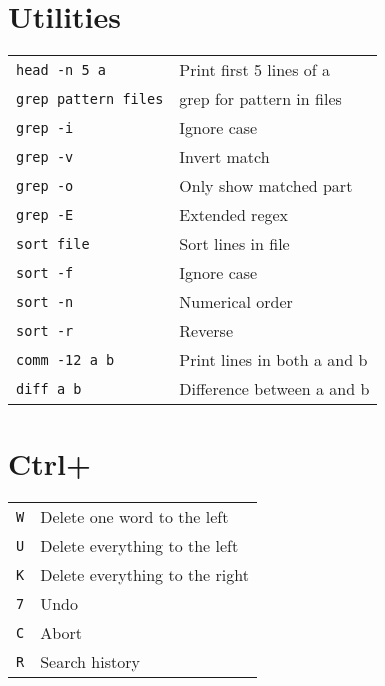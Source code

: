 \documentclass[a4paper, twocolumn]{article}
\renewcommand{\tt}{\texttt}
\begin{document}
\section{Utilities}
\begin{tabular}{ll}
    \tt{head -n 5 a}        & Print first 5 lines of a              \\
    \tt{grep pattern files} & grep for pattern in files             \\
    \tt{grep -i}            & Ignore case                           \\
    \tt{grep -v}            & Invert match                          \\
    \tt{grep -o}            & Only show matched part                \\
    \tt{grep -E}            & Extended regex                        \\
    \tt{sort file}          & Sort lines in file                    \\
    \tt{sort -f}            & Ignore case                           \\
    \tt{sort -n}            & Numerical order                       \\
    \tt{sort -r}            & Reverse                               \\
    \tt{comm -12 a b}       & Print lines in both a and b           \\
    \tt{diff a b}           & Difference between a and b
\end{tabular}

\section{Ctrl+}
\begin{tabular}{ll}
    \tt{W} & Delete one word to the left                           \\
    \tt{U} & Delete everything to the left                         \\
    \tt{K} & Delete everything to the right                        \\
    \tt{7} & Undo                                                  \\
    \tt{C} & Abort                                                 \\
    \tt{R} & Search history
\end{tabular}
\end{document}
